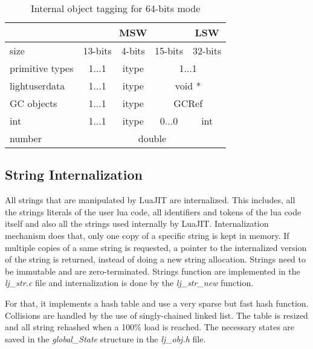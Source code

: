 \begin{table}[H]
\centering
\caption{Internal object tagging for 64-bits mode}
\label{tab:tagged-gc64}
\begin{tabular}{l|c|c|c|c|}
\cline{2-5}
                                      & \multicolumn{3}{c|}{MSW}         & LSW         \\ \hline
\multicolumn{1}{|l|}{size}            & 13-bits & 4-bits & 15-bits       & 32-bits     \\ \hline
\multicolumn{1}{|l|}{primitive types} & 1...1   & itype  & \multicolumn{2}{c|}{1...1}  \\
\multicolumn{1}{|l|}{lightuserdata}   & 1...1   & itype  & \multicolumn{2}{c|}{void *} \\
\multicolumn{1}{|l|}{GC objects}      & 1...1   & itype  & \multicolumn{2}{c|}{GCRef}  \\
\multicolumn{1}{|l|}{int}             & 1...1   & itype  & 0...0         & int         \\
\multicolumn{1}{|l|}{number}          & \multicolumn{4}{c|}{double}                    \\ \hline
\end{tabular}
\end{table}


\subsection{String Internalization}
\label{Subsec:string-inter}

All strings that are manipulated by LuaJIT are internalized. This includes, all
the strings literals of the user lua code, all identifiers and tokens of the lua
code itself and also all the strings used internally by LuaJIT. Internalization
mechanism does that, only one copy of a specific string is kept in memory. If
multiple copies of a same string is requested, a pointer to the internalized
version of the string is returned, instead of doing a new string allocation.
Strings need to be immutable and are zero-terminated. Strings function are
implemented in the \emph{lj\_str.c} file and internalization is done by the
\emph{lj\_str\_new} function.

For that, it implements a hash table and use a very sparse but fast hash
function. Collisions are handled by the use of singly-chained linked list.
The table is resized and all string rehashed when a 100\% load is reached.
The necessary states are saved in the \emph{global\_State} structure in the
\emph{lj\_obj.h} file.


